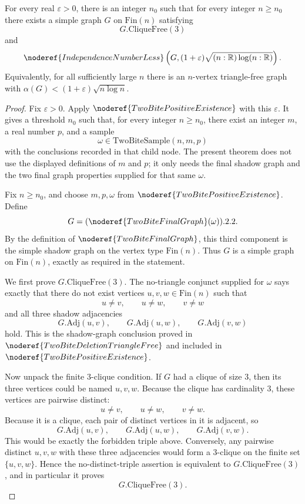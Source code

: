 \begin{theorem}
For every real \(\varepsilon>0\), there is an integer \(n_0\) such that for
every integer \(n\ge n_0\) there exists a simple graph \(G\) on
\(\mathrm{Fin}(n)\) satisfying
\[
G.\mathrm{CliqueFree}(3)
\]
and
\[
\noderef{IndependenceNumberLess}
\left(G,(1+\varepsilon)\sqrt{(n:\mathbb R)\log(n:\mathbb R)}\right).
\]
Equivalently, for all sufficiently large \(n\) there is an \(n\)-vertex
triangle-free graph with
\(\alpha(G)<(1+\varepsilon)\sqrt{n\log n}\).
\end{theorem}
\begin{proof}
Fix \(\varepsilon>0\).  Apply \(\noderef{TwoBitePositiveExistence}\) with this
\(\varepsilon\).  It gives a threshold \(n_0\) such that, for every integer
\(n\ge n_0\), there exist an integer \(m\), a real number \(p\), and a sample
\[
\omega\in \mathrm{TwoBiteSample}(n,m,p)
\]
with the conclusions recorded in that child node.  The present theorem does
not use the displayed definitions of \(m\) and \(p\); it only needs the final
shadow graph and the two final graph properties supplied for that same
\(\omega\).

Fix \(n\ge n_0\), and choose \(m,p,\omega\) from
\(\noderef{TwoBitePositiveExistence}\).  Define
\[
G=(\noderef{TwoBiteFinalGraph}(\omega)).2.2 .
\]
By the definition of \(\noderef{TwoBiteFinalGraph}\), this third component is
the simple shadow graph on the vertex type \(\mathrm{Fin}(n)\).  Thus \(G\) is
a simple graph on \(\mathrm{Fin}(n)\), exactly as required in the statement.

We first prove \(G.\mathrm{CliqueFree}(3)\).  The no-triangle conjunct supplied
for \(\omega\) says exactly that there do not exist vertices
\(u,v,w\in\mathrm{Fin}(n)\) such that
\[
u\ne v,\qquad u\ne w,\qquad v\ne w
\]
and all three shadow adjacencies
\[
G.\mathrm{Adj}(u,v),\qquad G.\mathrm{Adj}(u,w),\qquad G.\mathrm{Adj}(v,w)
\]
hold.  This is the shadow-graph conclusion proved in
\(\noderef{TwoBiteDeletionTriangleFree}\) and included in
\(\noderef{TwoBitePositiveExistence}\).

Now unpack the finite \(3\)-clique condition.  If \(G\) had a clique of size
\(3\), then its three vertices could be named \(u,v,w\).  Because the clique
has cardinality \(3\), these vertices are pairwise distinct:
\[
u\ne v,\qquad u\ne w,\qquad v\ne w.
\]
Because it is a clique, each pair of distinct vertices in it is adjacent, so
\[
G.\mathrm{Adj}(u,v),\qquad G.\mathrm{Adj}(u,w),\qquad G.\mathrm{Adj}(v,w).
\]
This would be exactly the forbidden triple above.  Conversely, any pairwise
distinct \(u,v,w\) with these three adjacencies would form a \(3\)-clique on
the finite set \(\{u,v,w\}\).  Hence the no-distinct-triple assertion is
equivalent to \(G.\mathrm{CliqueFree}(3)\), and in particular it proves
\[
G.\mathrm{CliqueFree}(3).
\]


\end{proof}
